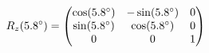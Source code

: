 \documentclass[preview]{standalone}
\begin{document}
\begin{align*}
\special{dvisvgm:raw <g id='unique000'>}R_z(5.8^\circ) = \begin{pmatrix} \cos(5.8^\circ) & -\sin(5.8^\circ) & 0 \\ \sin(5.8^\circ) & \cos(5.8^\circ) & 0 \\ 0 & 0 & 1 \end{pmatrix}\special{dvisvgm:raw </g>}
\end{align*}
\end{document}

